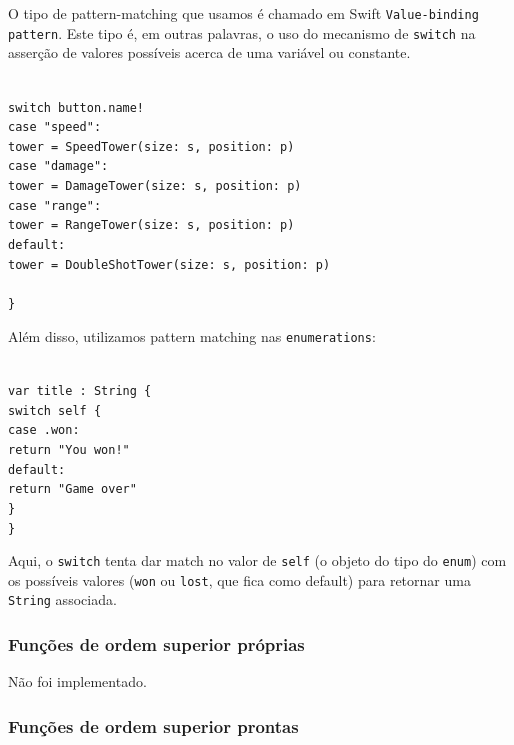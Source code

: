 \documentclass[rel_mlp]{iiufrgs}
\newcommand\tab[1][1cm]{\hspace*{#1}}
\begin{document}
O tipo de pattern-matching que usamos é chamado em Swift \texttt{Value-binding pattern}. Este tipo é, em outras palavras, o uso do mecanismo de \texttt{switch} na asserção de valores possíveis acerca de uma variável ou constante.

\texttt{
\\switch button.name! {
\\\tab case "speed":
\\\tab\tab tower = SpeedTower(size: s, position: p)
\\\tab case "damage":
\\\tab\tab tower = DamageTower(size: s, position: p)
\\\tab case "range":
\\\tab\tab tower = RangeTower(size: s, position: p)
\\\tab default:
\\\tab\tab tower = DoubleShotTower(size: s, position: p)
\\\tab }
\\\}
}

Além disso, utilizamos pattern matching nas \texttt{enumerations}:

\texttt{
\\var title : String \{
\\\tab switch self \{
\\\tab\tab case .won:
\\\tab\tab\tab return "You won!"
\\\tab\tab default:
\\\tab\tab\tab return "Game over"
\\\tab \}
\\\}
}

Aqui, o \texttt{switch} tenta dar match no valor de \texttt{self} (o objeto do tipo do \texttt{enum}) com os possíveis valores (\texttt{won} ou \texttt{lost}, que fica como default) para retornar uma \texttt{String} associada.


\subsubsection{Funções de ordem superior próprias}

Não foi implementado.


\subsubsection{Funções de ordem superior prontas}
\end{document}
